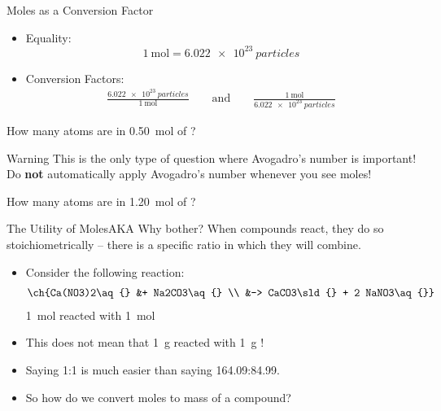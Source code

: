 \documentclass[notes=only]{beamer}
\begin{document}
\begin{frame}{Moles as a Conversion Factor}
	\begin{itemize}
		\item Equality:
			\begin{equation*}
				\SI{1}{\mole} = \SI{6.022e23}{particles}
			\end{equation*}
		\item Conversion Factors:
			\begin{align*}
				\frac{\SI{6.022e23}{particles}}{\SI{1}{\mole}}
				\qquad\text{and}\qquad
				\frac{\SI{1}{\mole}}{\SI{6.022e23}{particles}}
			\end{align*}
	\end{itemize}

	\pause
	\bigskip

	How many  atoms are in \SI{0.50}{\mole} of ?



	\bigskip

	\begin{block}{Warning}
		This is the only type of question where Avogadro's number is
		important! Do \textbf{not} automatically apply Avogadro's number
		whenever you see moles!
	\end{block}
\end{frame}

\begin{onyourown}%
	How many  atoms are in \SI{1.20}{\mole} of ?
\end{onyourown}

\begin{frame}{The Utility of Moles}{AKA Why bother?}
	When compounds react, they do so \alert{stoichiometrically}
		-- there is a specific ratio in which they will combine.
		\begin{itemize}[<+(1)->]
			\item Consider the following reaction: %
				\begin{align*}
					\ch{Ca(NO3)2\aq{} &+ Na2CO3\aq{} \\ 
					&->
					CaCO3\sld{} + 2 NaNO3\aq{}}
				\end{align*}
				\alert{\SI{1}{\mole}} 
				reacted with \alert{\SI{1}{\mole}}
			\item This \alert{does not} mean that \SI{1}{\gram}
				 reacted with \SI{1}{\gram}
				!
			\item Saying 1:1 is much easier than saying
				164.09:84.99.
			\item So how do we convert moles to mass of a compound?
		\end{itemize}
\end{frame}
\end{document}
